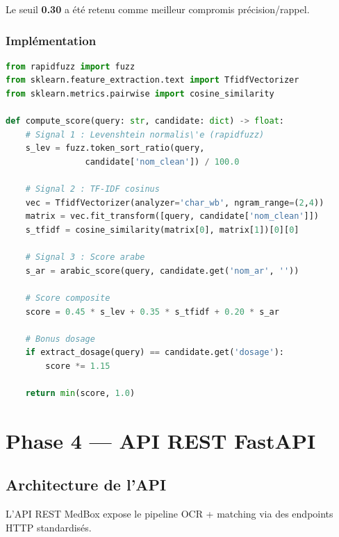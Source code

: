 \documentclass[12pt,a4paper]{report}
\begin{document}
Le seuil \textbf{0.30} a \'et\'e retenu comme meilleur compromis pr\'ecision/rappel.

\subsection{Impl\'ementation}

\begin{codebox}
\begin{lstlisting}[language=Python]
from rapidfuzz import fuzz
from sklearn.feature_extraction.text import TfidfVectorizer
from sklearn.metrics.pairwise import cosine_similarity

def compute_score(query: str, candidate: dict) -> float:
    # Signal 1 : Levenshtein normalis\'e (rapidfuzz)
    s_lev = fuzz.token_sort_ratio(query, 
                candidate['nom_clean']) / 100.0
    
    # Signal 2 : TF-IDF cosinus
    vec = TfidfVectorizer(analyzer='char_wb', ngram_range=(2,4))
    matrix = vec.fit_transform([query, candidate['nom_clean']])
    s_tfidf = cosine_similarity(matrix[0], matrix[1])[0][0]
    
    # Signal 3 : Score arabe
    s_ar = arabic_score(query, candidate.get('nom_ar', ''))
    
    # Score composite
    score = 0.45 * s_lev + 0.35 * s_tfidf + 0.20 * s_ar
    
    # Bonus dosage
    if extract_dosage(query) == candidate.get('dosage'):
        score *= 1.15
    
    return min(score, 1.0)
\end{lstlisting}
\end{codebox}

\chapter{Phase 4 --- API REST FastAPI}

\section{Architecture de l'API}

L'API REST MedBox expose le pipeline OCR + matching via des endpoints HTTP standardis\'es.
\end{document}
